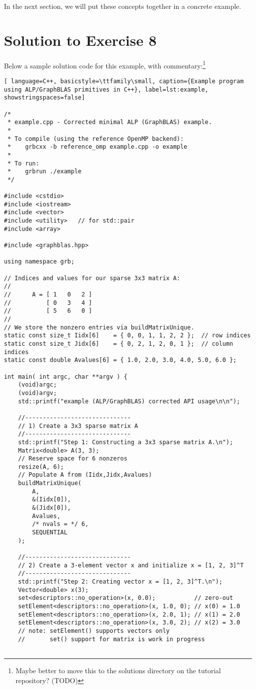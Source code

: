 In the next section, we will put these concepts together in a concrete example.


\section{Solution to Exercise 8}\label{sec:simple_example}

Below a sample solution code for this example, with commentary:\footnote{Maybe better to move this to the solutions directory on the tutorial repository? (TODO)}

\begin{lstlisting}[ language=C++, basicstyle=\ttfamily\small, caption={Example program using ALP/GraphBLAS primitives in C++}, label=lst:example, showstringspaces=false]

/*
 * example.cpp - Corrected minimal ALP (GraphBLAS) example.
 *
 * To compile (using the reference OpenMP backend):
 *    grbcxx -b reference_omp example.cpp -o example
 *
 * To run:
 *    grbrun ./example
 */

#include <cstdio>
#include <iostream>
#include <vector>
#include <utility>   // for std::pair
#include <array>

#include <graphblas.hpp>

using namespace grb;

// Indices and values for our sparse 3x3 matrix A:
//
//      A = [ 1   0   2 ]
//          [ 0   3   4 ]
//          [ 5   6   0 ]
//
// We store the nonzero entries via buildMatrixUnique.
static const size_t Iidx[6]    = { 0, 0, 1, 1, 2, 2 };  // row indices
static const size_t Jidx[6]    = { 0, 2, 1, 2, 0, 1 };  // column indices
static const double Avalues[6] = { 1.0, 2.0, 3.0, 4.0, 5.0, 6.0 };

int main( int argc, char **argv ) {
    (void)argc;
    (void)argv;
    std::printf("example (ALP/GraphBLAS) corrected API usage\n\n");

    //------------------------------
    // 1) Create a 3x3 sparse matrix A
    //------------------------------
    std::printf("Step 1: Constructing a 3x3 sparse matrix A.\n");
    Matrix<double> A(3, 3);
    // Reserve space for 6 nonzeros
    resize(A, 6);
    // Populate A from (Iidx,Jidx,Avalues)
    buildMatrixUnique(
        A,
        &(Iidx[0]),
        &(Jidx[0]),
        Avalues,
        /* nvals = */ 6,
        SEQUENTIAL
    );

    //------------------------------
    // 2) Create a 3-element vector x and initialize x = [1, 2, 3]^T
    //------------------------------
    std::printf("Step 2: Creating vector x = [1, 2, 3]^T.\n");
    Vector<double> x(3);
    set<descriptors::no_operation>(x, 0.0);           // zero-out
    setElement<descriptors::no_operation>(x, 1.0, 0); // x(0) = 1.0
    setElement<descriptors::no_operation>(x, 2.0, 1); // x(1) = 2.0
    setElement<descriptors::no_operation>(x, 3.0, 2); // x(2) = 3.0
    // note: setElement() supports vectors only
    //       set() support for matrix is work in progress


\end{lstlisting}
